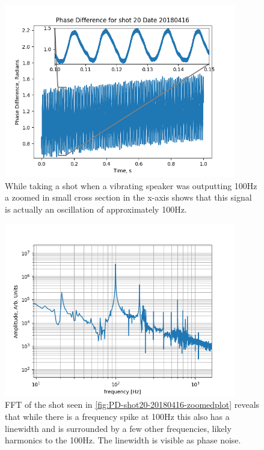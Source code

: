 \documentclass[12pt,a4paper,oneside]{report}
\begin{document}
\begin{figure}[H] 
\includegraphics[width=0.9\textwidth, center,angle=0]{DImages/PD_-_shot_20_-_20180416_-_zoomed_plot_-_100Hz_speaker.png}
\caption{While taking a shot when a vibrating speaker was outputting 100Hz a zoomed in small cross section in the x-axis shows that this signal is actually an oscillation of approximately 100Hz.}
\label{fig:PD-shot20-20180416-zoomedplot}
\end{figure}

\begin{figure}[H] 
\includegraphics[width=0.9\textwidth, center,angle=0]{DImages/FFT_for_shot_20_Date_20180416.png}
\caption{FFT of the shot seen in \autoref{fig:PD-shot20-20180416-zoomedplot} reveals that while there is a frequency spike at 100Hz this also has a linewidth and is surrounded by a few other frequencies, likely harmonics to the 100Hz. The linewidth is visible as phase noise.}
\label{fig:FFT-shot20-20180416-zoomed-10Hz-1000Hz}
\end{figure}
\end{document}
